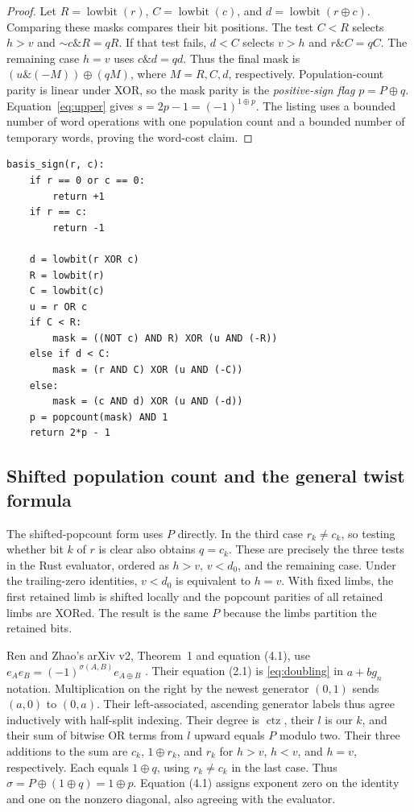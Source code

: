 \documentclass[11pt]{article}
\newcommand{\ctz}{\operatorname{ctz}}
\newcommand{\lowbit}{\operatorname{lowbit}}
\newcommand{\band}{\mathbin{\&}}
\begin{document}
\begin{proof}
Let \(R=\lowbit(r)\), \(C=\lowbit(c)\), and
\(d=\lowbit(r\oplus c)\). Comparing these masks compares their
bit positions. The test \(C<R\) selects \(h>v\) and
\(\mathord{\sim}c\band R=qR\). If that test fails, \(d<C\)
selects \(v>h\) and \(r\band C=qC\). The remaining case
\(h=v\) uses \(c\band d=qd\). Thus the final mask is
\((u\band(-M))\oplus(qM)\), where \(M=R,C,d\), respectively.
Population-count parity is linear under XOR, so the mask parity is the
\emph{positive-sign flag} \(p=P\oplus q\). Equation~\eqref{eq:upper}
gives \(s=2p-1=(-1)^{1\oplus p}\). The listing uses a bounded number
of word operations with one population count and a bounded number of
temporary words, proving the word-cost claim.
\end{proof}

\begin{lstlisting}[float=tbp,caption={Unsigned word evaluator. Negation and NOT act on the full word.},label={lst:mask}]
basis_sign(r, c):
    if r == 0 or c == 0:
        return +1
    if r == c:
        return -1

    d = lowbit(r XOR c)
    R = lowbit(r)
    C = lowbit(c)
    u = r OR c
    if C < R:
        mask = ((NOT c) AND R) XOR (u AND (-R))
    else if d < C:
        mask = (r AND C) XOR (u AND (-C))
    else:
        mask = (c AND d) XOR (u AND (-d))
    p = popcount(mask) AND 1
    return 2*p - 1
\end{lstlisting}

\subsection{Shifted population count and the general twist formula}
The shifted-popcount form uses \(P\) directly. In the third case
\(r_k\ne c_k\), so testing whether bit \(k\) of \(r\) is clear
also obtains \(q=c_k\). These are precisely the three tests in the
Rust evaluator, ordered as \(h>v\), \(v<d_0\), and the remaining
case. Under the trailing-zero identities, \(v<d_0\) is equivalent to
\(h=v\). With fixed limbs, the first retained limb is shifted locally
and the popcount parities of all retained limbs are XORed. The result is
the same \(P\) because the limbs partition the retained bits.

Ren and Zhao's arXiv v2, Theorem~1 and equation (4.1), use
\(e_Ae_B=(-1)^{\sigma(A,B)}e_{A\oplus B}\) \cite{renv2}.
Their equation (2.1) is \eqref{eq:doubling} in \(a+bg_n\)
notation. Multiplication on the right by the newest generator
\((0,1)\) sends \((a,0)\) to \((0,a)\). Their left-associated,
ascending generator labels thus agree inductively with half-split indexing.
Their degree is \(\ctz\), their \(l\) is our \(k\), and their
sum of bitwise OR terms from \(l\) upward equals \(P\) modulo two.
Their three additions to the sum are \(c_k\), \(1\oplus r_k\),
and \(r_k\) for \(h>v\), \(h<v\), and \(h=v\), respectively.
Each equals \(1\oplus q\), using \(r_k\ne c_k\) in the last
case. Thus \(\sigma=P\oplus(1\oplus q)=1\oplus p\). Equation
(4.1) assigns exponent zero on the identity and one on the nonzero
diagonal, also agreeing with the evaluator.
\end{document}
